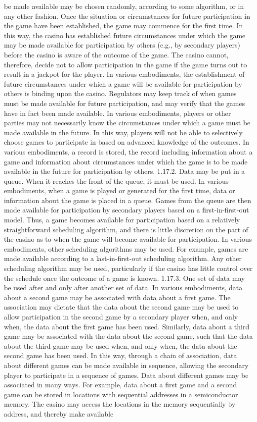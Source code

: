 \documentclass[11pt,a4paper]{article}
\begin{document}
be made available may be chosen randomly, according to some algorithm, or in any other fashion. Once the situation or circumstances for future participation in the game have been established, the game may commence for the first time. In this way, the casino has established future circumstances under which the game may be made available for participation by others (e.g., by secondary players) before the casino is aware of the outcome of the game. The casino cannot, therefore, decide not to allow participation in the game if the game turns out to result in a jackpot for the player. In various embodiments, the establishment of future circumstances under which a game will be available for participation by others is binding upon the casino. Regulators may keep track of when games must be made available for future participation, and may verify that the games have in fact been made available. In various embodiments, players or other parties may not necessarily know the circumstances under which a game must be made available in the future. In this way, players will not be able to selectively choose games to participate in based on advanced knowledge of the outcomes. In various embodiments, a record is stored, the record including information about a game and information about circumstances under which the game is to be made available in the future for participation by others. 1.17.2. Data may be put in a queue. When it reaches the front of the queue, it must be used. In various embodiments, when a game is played or generated for the first time, data or information about the game is placed in a queue. Games from the queue are then made available for participation by secondary players based on a first-in-first-out model. Thus, a game becomes available for participation based on a relatively straightforward scheduling algorithm, and there is little discretion on the part of the casino as to when the game will become available for participation. In various embodiments, other scheduling algorithms may be used. For example, games are made available according to a last-in-first-out scheduling algorithm. Any other scheduling algorithm may be used, particularly if the casino has little control over the schedule once the outcome of a game is known. 1.17.3. One set of data may be used after and only after another set of data. In various embodiments, data about a second game may be associated with data about a first game. The association may dictate that the data about the second game may be used to allow participation in the second game by a secondary player when, and only when, the data about the first game has been used. Similarly, data about a third game may be associated with the data about the second game, such that the data about the third game may be used when, and only when, the data about the second game has been used. In this way, through a chain of association, data about different games can be made available in sequence, allowing the secondary player to participate in a sequence of games. Data about different games may be associated in many ways. For example, data about a first game and a second game can be stored in locations with sequential addresses in a semiconductor memory. The casino may access the locations in the memory sequentially by address, and thereby make available 
\end{document}
